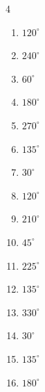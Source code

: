\begin{multicols}{4}
\begin{enumerate}
  \item $\displaystyle 120^{\circ}$

  \item $\displaystyle 240^{\circ}$

  \item $\displaystyle 60^{\circ}$

  \item $\displaystyle 180^{\circ}$
        \phantom{$\displaystyle =\pi$}

  \item $\displaystyle 270^{\circ}$

  \item $\displaystyle 135^{\circ}$

  \item $\displaystyle 30^{\circ}$

  \item $\displaystyle 120^{\circ}$

  \item $\displaystyle 210^{\circ}$

  \item $\displaystyle 45^{\circ}$

  \item $\displaystyle 225^{\circ}$

  \item $\displaystyle 135^{\circ}$

  \item $\displaystyle 330^{\circ}$

  \item $\displaystyle 30^{\circ}$

  \item $\displaystyle 135^{\circ}$

  \item $\displaystyle 180^{\circ}$
        \phantom{$\displaystyle =\pi$}


\end{enumerate}
\end{multicols}
